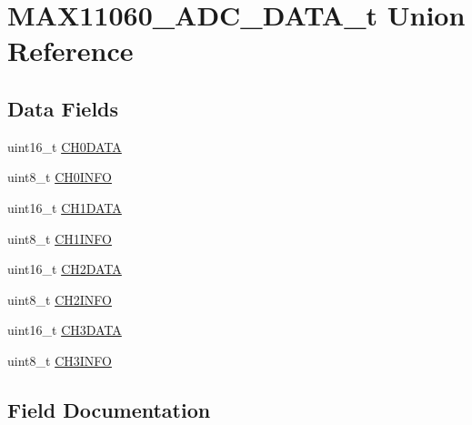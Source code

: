 \hypertarget{union_m_a_x11060___a_d_c___d_a_t_a__t}{}\section{M\+A\+X11060\+\_\+\+A\+D\+C\+\_\+\+D\+A\+T\+A\+\_\+t Union Reference}
\label{union_m_a_x11060___a_d_c___d_a_t_a__t}
\subsection*{Data Fields}
\begin{DoxyCompactItemize}
\item 
uint16\+\_\+t \hyperlink{union_m_a_x11060___a_d_c___d_a_t_a__t_a2281802599fe51606d59ba59cc96b599}{C\+H0\+D\+A\+T\+A}
\item 
uint8\+\_\+t \hyperlink{union_m_a_x11060___a_d_c___d_a_t_a__t_ab68c06ea3036c45d8acf8a8bafbbdc55}{C\+H0\+I\+N\+F\+O}
\item 
uint16\+\_\+t \hyperlink{union_m_a_x11060___a_d_c___d_a_t_a__t_ad81c1cf17d5afbf7c980d05b47199ca5}{C\+H1\+D\+A\+T\+A}
\item 
uint8\+\_\+t \hyperlink{union_m_a_x11060___a_d_c___d_a_t_a__t_a96dc59d4ccd75194ec65f1d3f7d59936}{C\+H1\+I\+N\+F\+O}
\item 
uint16\+\_\+t \hyperlink{union_m_a_x11060___a_d_c___d_a_t_a__t_aad21a92fdd0012488a50bee6e010debb}{C\+H2\+D\+A\+T\+A}
\item 
uint8\+\_\+t \hyperlink{union_m_a_x11060___a_d_c___d_a_t_a__t_aa17517e035c3bdf5ecc423175a33d648}{C\+H2\+I\+N\+F\+O}
\item 
uint16\+\_\+t \hyperlink{union_m_a_x11060___a_d_c___d_a_t_a__t_adbe299473aad31895b9e68ad4eaefaf0}{C\+H3\+D\+A\+T\+A}
\item 
uint8\+\_\+t \hyperlink{union_m_a_x11060___a_d_c___d_a_t_a__t_a382d2737c0b6b44464acd263161fb41f}{C\+H3\+I\+N\+F\+O}
\end{DoxyCompactItemize}


\subsection{Field Documentation}
\hypertarget{union_m_a_x11060___a_d_c___d_a_t_a__t_a2281802599fe51606d59ba59cc96b599}{}
